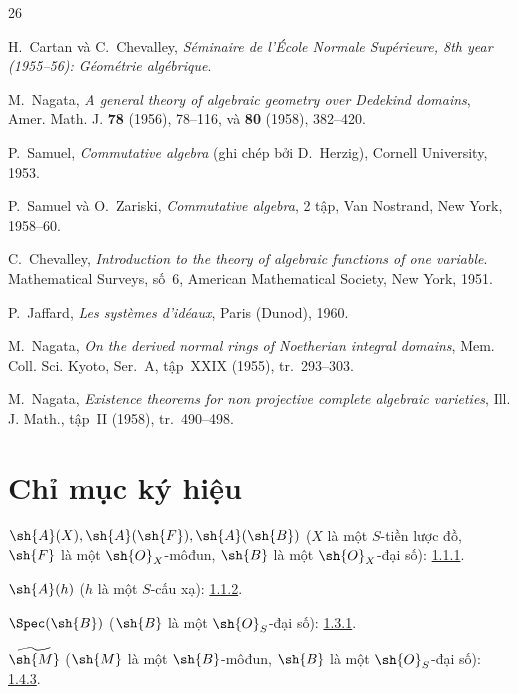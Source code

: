 \documentclass[oneside,10pt]{amsart}
\newcommand{\oldpage}[2][]{\marginnote{\normalfont\footnotesize\textbf{#1}~|~#2}\ignorespaces}
\begin{document}
\begin{thebibliography}{26}

H.~Cartan và C.~Chevalley,
\emph{Séminaire de l'École Normale Supérieure, 8th year (1955--56):
Géométrie algébrique}.

M.~Nagata,
\emph{A general theory of algebraic geometry over Dedekind domains},
Amer. Math. J. \textbf{78} (1956), 78--116, và \textbf{80} (1958),
382--420.

P.~Samuel,
\emph{Commutative algebra} (ghi chép bởi D.~Herzig), Cornell University,
1953.

P.~Samuel và O.~Zariski,
\emph{Commutative algebra}, 2 tập, Van Nostrand, New York, 1958--60.

\oldpage[II]{205}
C.~Chevalley,
\emph{Introduction to the theory of algebraic functions of one variable}.
Mathematical Surveys, số~6, American Mathematical Society, New York, 1951.

P.~Jaffard,
\emph{Les systèmes d'idéaux}, Paris (Dunod), 1960.

M.~Nagata,
\emph{On the derived normal rings of Noetherian integral domains},
Mem. Coll. Sci. Kyoto, Ser.~A, tập~XXIX (1955), tr.~293--303.

M.~Nagata,
\emph{Existence theorems for non projective complete algebraic varieties},
Ill. J. Math., tập~II (1958), tr.~490--498.

\end{thebibliography}
\clearpage
\oldpage[II]{206}
\clearpage
\oldpage[II]{207}
{}
\section*{Chỉ mục ký hiệu}

\begingroup
\small
\setlength{\parindent}{0pt}
\setlength{\parskip}{2pt}

$\sh{A}(X),\sh{A}(\sh{F}),\sh{A}(\sh{B})$
($X$ là một $S$-tiền lược đồ, $\sh{F}$ là một $\sh{O}_X$-môđun,
$\sh{B}$ là một $\sh{O}_X$-đại số): \hyperref[II.1.1.1]{1.1.1}.

$\sh{A}(h)$ ($h$ là một $S$-cấu xạ): \hyperref[II.1.1.2]{1.1.2}.

$\Spec(\sh{B})$ ($\sh{B}$ là một $\sh{O}_S$-đại số): \hyperref[II.1.3.1]{1.3.1}.

$\widetilde{\sh{M}}$ ($\sh{M}$ là một $\sh{B}$-môđun,
$\sh{B}$ là một $\sh{O}_S$-đại số): \hyperref[II.1.4.3]{1.4.3}.
\end{document}
